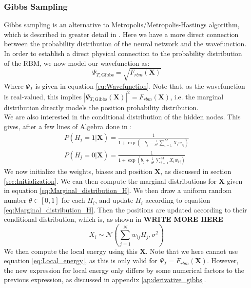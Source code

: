 \documentclass[a4paper, 10pt]{article}
\begin{document}
	\subsubsection{Gibbs Sampling}
	Gibbs sampling is an alternative to Metropolis/Metropolis-Hastings algorithm, which is described in greater detail in \cite{Wang2014}. Here we have a more direct connection between the probability distribution of the neural network and the wavefunction. In order to establish a direct physical connection to the probability distribution of the RBM, we now model our wavefunction as:
	\begin{equation}\label{eq:wavefunction_Gibbs}
	\Psi_{T, \mathrm{Gibbs}} =\sqrt{F_{rbm}(\boldsymbol{X})}
	\end{equation}
	Where $\Psi_T$ is given in equation \ref{eq:Wavefunction}. Note that, as the wavefunction is real-valued, this implies $|\Psi_{T, \mathrm{Gibbs}}(\boldsymbol{X})|^2 = F_{rbm}(\boldsymbol{X})$, i.e. the marginal distribution directly models the position probability distribution.\\
	\linebreak
	We are also interested in the conditional distribution of the hidden nodes. This gives, after a few lines of Algebra done in \cite{Hjorth-Jensen2018}:
	\begin{equation}\label{eq:Marginal_distribution_H}
	\begin{split}
	P(H_j=1|\boldsymbol{X})=\frac{1}{1+\exp\left(-b_j-\frac{1}{\sigma^2}\sum_{i=1}^M X_i w_{ij}\right)}\\
	P(H_j=0|\boldsymbol{X})=\frac{1}{1+\exp\left(b_j+\frac{1}{\sigma^2}\sum_{i=1}^M X_i w_{ij}\right)}
	\end{split}
	\end{equation}
	We now initialize the weights, biases and position $\boldsymbol{X}$, as discussed in section \ref{sec:Initialization}. We can then compute the marginal distributions for $\boldsymbol{X}$ given in equation \ref{eq:Marginal_distribution_H}. We then draw a uniform random number $\theta \in [0,1]$ for each $H_i$, and update $H_i$ according to equation \ref{eq:Marginal_distribution_H}. Then the positions are updated according to their conditional distribution, which is, as shown in \cite{Hjorth-Jensen2018} \textbf{WRITE MORE HERE}
	\begin{equation}
	X_i\sim \mathcal{N}\left(\sum_{j=1}^Nw_{ij}H_j, \sigma^2\right)
	\end{equation}
	We then compute the local energy using this $\boldsymbol{X}$. Note that we here cannot use equation \ref{eq:Local_energy}, as this is only valid for $\Psi_T = F_{rbm}(\boldsymbol{X})$. However, the new expression for local energy only differs by some numerical factors to the previous expression, as discussed in appendix \ref{ap:derivative_gibbs}. 
\end{document}
